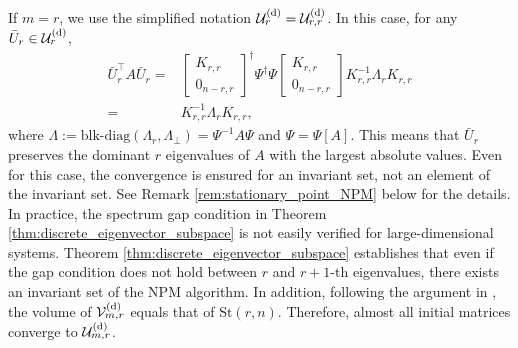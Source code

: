 \documentclass{ifacconf}
\begin{document}
If $m=r$, we use the simplified notation $\mathcal{U}_{r}^{\rm (d)} = \mathcal{U}_{r,r}^{\rm (d)}$. 
In this case, for any $\bar{U}_{r} \in \mathcal{U}_{r}^{\rm (d)} $, 
\begin{align}
 \bar{U}_{r}^{\top}A\bar{U}_{r} 
 =&  \begin{bmatrix} K_{r,r} \\ 0_{n-r,r} \end{bmatrix}^{\dagger} \Psi ^{\dagger} \Psi \begin{bmatrix} K_{r,r} \\ 0_{n-r,r} \end{bmatrix}  K_{r,r}^{-1} \Lambda _{r} K_{r,r} 
 \nonumber \\ 
 =& K_{r,r}^{-1} \Lambda _{r} K_{r,r},
 \label{eq:eigenvalue_preserving}
\end{align}
where $\Lambda := \mbox{blk-diag} (\Lambda _{r}, \Lambda _{\perp}) = \Psi ^{-1} A \Psi $ and $\Psi = \Psi [A]$. This means that $\bar{U}_{r}$ preserves the dominant $r$ eigenvalues of $A$ with the largest absolute values. 
Even for this case, the convergence is ensured for an invariant set, not an element of the invariant set. See Remark \ref{rem:stationary_point_NPM} below for the details. 
In practice, the spectrum gap condition in Theorem \ref{thm:discrete_eigenvector_subspace} is not easily verified for large-dimensional systems. Theorem \ref{thm:discrete_eigenvector_subspace} establishes that even if the gap condition does not hold between $r$ and $r+1$-th eigenvalues, there exists an invariant set of the NPM algorithm. 
In addition, following the argument in \cite[\S III.C]{TsuzukiOhki2025global}, the volume of $\mathcal{V}_{m,r}^{\rm (d)}$ equals that of $\mathrm{St}(r,n)$. 
Therefore, almost all initial matrices converge to $\mathcal{U}_{m,r}^{\rm (d)}$.
\end{document}
